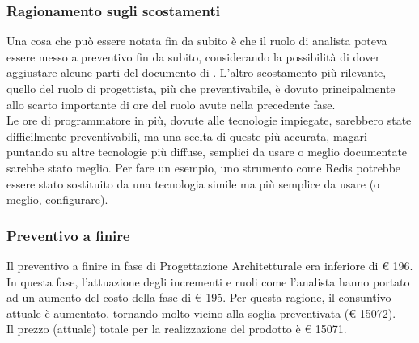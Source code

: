 \subsubsection{Ragionamento sugli scostamenti}
Una cosa che può essere notata fin da subito è che il ruolo di analista poteva essere messo a preventivo fin da subito, considerando la possibilità di dover aggiustare alcune parti del documento di \AdR{}. L'altro scostamento più rilevante, quello del ruolo di progettista, più che preventivabile, è dovuto principalmente allo scarto importante di ore del ruolo avute nella precedente fase.\\
Le ore di programmatore in più, dovute alle tecnologie impiegate, sarebbero state difficilmente preventivabili, ma una scelta di queste più accurata, magari puntando su altre tecnologie più diffuse, semplici da usare o meglio documentate sarebbe stato meglio. Per fare un esempio, uno strumento come Redis potrebbe essere stato sostituito da una tecnologia simile ma più semplice da usare (o meglio, configurare).

\subsubsection{Preventivo a finire}
Il preventivo a finire in fase di Progettazione Architetturale era inferiore di \euro{} 196. In questa fase, l'attuazione degli incrementi e ruoli come l'analista hanno portato ad un aumento del costo della fase di \euro{} 195. Per questa ragione, il consuntivo attuale è aumentato, tornando molto vicino alla soglia preventivata (\euro{} 15072).\\
Il prezzo (attuale) totale per la realizzazione del prodotto è \euro{} 15071.